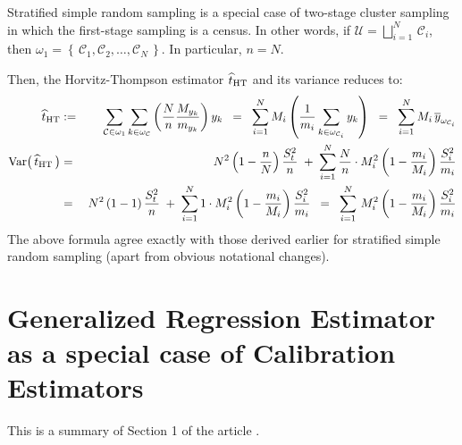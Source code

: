 \documentclass{article}
\begin{document}
Stratified simple random sampling is a special case of two-stage cluster sampling in which the first-stage sampling is a census.  In other words, if $\mathcal{U} = \displaystyle{\bigsqcup_{i=1}^{N}}\,\mathcal{C}_{i}$, then $\omega_{1} = \left\{\,\mathcal{C}_{1},\mathcal{C}_{2},\ldots,\mathcal{C}_{N}\,\right\}$.  In particular, $n = N$.

Then, the Horvitz-Thompson estimator $\widehat{t}_{\textnormal{HT}}$ and its variance reduces to:
\begin{eqnarray*}
\widehat{t}_{\textnormal{HT}}
& := & \sum_{\mathcal{C}\in\omega_{1}} \sum_{k\in\omega_{\mathcal{C}}}\left(\dfrac{N}{n}\dfrac{M_{y_{k}}}{m_{y_{k}}}\right)y_{k}
\;\;=\;\;  \sum_{i=1}^{N} M_{i}\left(\dfrac{1}{m_{i}} \sum_{k\in\omega_{\mathcal{C}_{i}}}y_{k}\right) 
\;\;=\;\;  \sum_{i=1}^{N} M_{i}\,\overline{y}_{\omega_{\mathcal{C}_{i}}}
\\
\textnormal{Var}\!\left(\,\widehat{t}_{\textnormal{HT}}\,\right)
& = &
N^{2}\left(1-\dfrac{n}{N}\right)\dfrac{S^{2}_{t}}{n} \; + \; 
\sum^{N}_{i=1}\dfrac{N}{n}\cdot M_{i}^{2}\left(1-\dfrac{m_{i}}{M_{i}}\right)\dfrac{S^{2}_{i}}{m_{i}} \\
& = &
N^{2}\left(1-1\right)\dfrac{S^{2}_{t}}{n} \; + \; 
\sum^{N}_{i=1}1\cdot M_{i}^{2}\left(1-\dfrac{m_{i}}{M_{i}}\right)\dfrac{S^{2}_{i}}{m_{i}}
\;\;=\;\;
\sum^{N}_{i=1}\,M_{i}^{2}\left(1-\dfrac{m_{i}}{M_{i}}\right)\dfrac{S^{2}_{i}}{m_{i}}
\end{eqnarray*}
The above formula agree exactly with those derived earlier for stratified simple random sampling (apart from obvious notational changes).


\section{Generalized Regression Estimator as a special case of Calibration Estimators}
\setcounter{theorem}{0}

This is a summary of Section 1 of the article \cite{DevilleSarndal1992}.
\end{document}

